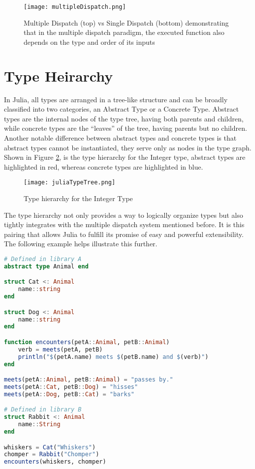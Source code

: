 \begin{figure}[!h]
    \texttt{[image: multipleDispatch.png]}
    \centering
    \caption{Multiple Dispatch (top) vs Single Dispatch (bottom) demonstrating that in the multiple dispatch paradigm, the executed function also depends on the type and order of its inputs} 
    \label{fig:multipleDispatch}
\end{figure}

\section{Type Heirarchy}
In Julia, all types are arranged in a tree-like structure and can be broadly classified into two categories, an Abstract
Type or a Concrete Type. Abstract types are the internal nodes of the type tree, having both parents and children, while
concrete types are the ``leaves'' of the tree, having parents but no children. Another notable difference between
abstract types and concrete types is that abstract types cannot be instantiated, they serve only as nodes in the type
graph. Shown in Figure \ref{fig:juliaTypeHeirarchy}, is the type hierarchy for the Integer type, abstract types are
highlighted in red, whereas concrete types are highlighted in blue. \hfill
\begin{figure}[t]
    \texttt{[image: juliaTypeTree.png]}
    \centering
    \caption{Type hierarchy for the Integer Type} 
    \label{fig:juliaTypeHeirarchy}
\end{figure}
\FloatBarrier
The type hierarchy not only provides a way to logically organize types but also tightly integrates with the multiple
dispatch system mentioned before. It is this pairing that allows Julia to fulfill its promise of easy and powerful
extensibility. The following example helps illustrate this further.
\begin{lstlisting}[language=Julia]
# Defined in library A
abstract type Animal end

struct Cat <: Animal
    name::string
end

struct Dog <: Animal
    name::string
end

function encounters(petA::Animal, petB::Animal)
    verb = meets(petA, petB)
    println("$(petA.name) meets $(petB.name) and $(verb)")
end

meets(petA::Animal, petB::Animal) = "passes by."
meets(petA::Cat, petB::Dog) = "hisses"
meets(petA::Dog, petB::Cat) = "barks"

# Defined in library B
struct Rabbit <: Animal
    name::String
end

whiskers = Cat("Whiskers")
chomper = Rabbit("Chomper")
encounters(whiskers, chomper)
\end{lstlisting}
